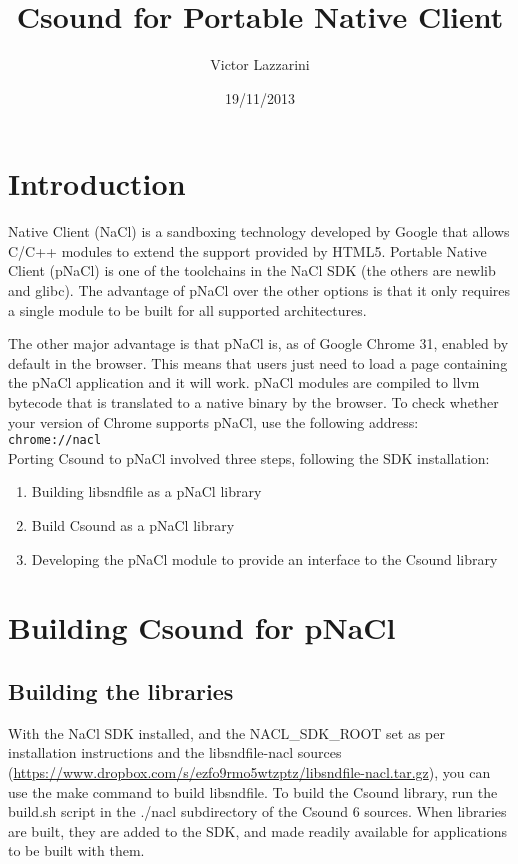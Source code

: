 \documentclass[11pt]{article}
\begin{document}
\title{Csound for Portable Native Client}
\author{Victor Lazzarini}
\date{19/11/2013}
\maketitle

\section{Introduction}

Native Client (NaCl) is a sandboxing technology developed by Google that allows C/C++ modules to extend the support provided
by HTML5. Portable Native Client (pNaCl) is one of the toolchains in the NaCl SDK (the others are newlib and glibc). The advantage
of pNaCl over the other options is that it only requires a single module to be built for all supported architectures.

The other major advantage is that pNaCl is, as of Google Chrome 31, enabled by default in the browser. This means that users
just need to load a page containing the pNaCl application and it will work. pNaCl modules are compiled to llvm bytecode that is 
translated to a native binary by the browser. To check whether your version of Chrome supports pNaCl, use the following address:
\\

 {\tt chrome://nacl }
\\

Porting Csound to pNaCl involved three steps, following the SDK installation:
\\
\begin{enumerate}
\item Building libsndfile as a pNaCl library
\item Build Csound as a pNaCl library
\item Developing the pNaCl module to provide an interface to the Csound library
\end{enumerate}


\section{Building Csound for pNaCl}

\subsection{Building the libraries}

With the NaCl SDK installed, and the NACL\_SDK\_ROOT set as per installation instructions and the libsndfile-nacl sources
(\url{https://www.dropbox.com/s/ezfo9rmo5wtzptz/libsndfile-nacl.tar.gz}),
you can use the make command to build libsndfile. To build the Csound library, run  the build.sh script in the ./nacl subdirectory 
of the Csound 6 sources. When libraries are built, they are added to the SDK, and made readily available for applications to be
built with them.
\end{document}
